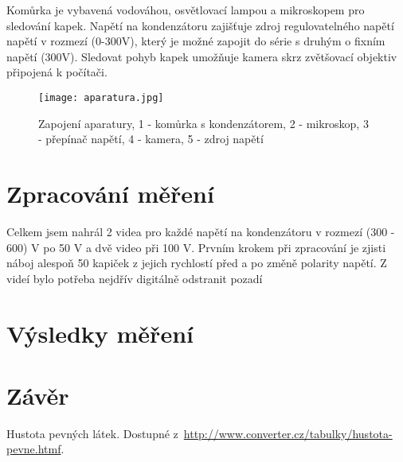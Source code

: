 \documentclass[a4paper,11pt]{article}
\begin{document}
Komůrka je vybavená vodováhou, osvětlovací lampou a mikroskopem pro sledování kapek. Napětí na kondenzátoru zajišťuje zdroj regulovatelného napětí napětí v rozmezí (0-300V), který je možné zapojit do série s druhým o fixním napětí (300V). Sledovat pohyb kapek umožňuje kamera skrz zvětšovací objektiv připojená k počítači. 

\begin{figure}[htpb]
    \centering
    \texttt{[image: aparatura.jpg]}
    \caption{Zapojení aparatury, 1 - komůrka s kondenzátorem, 2 - mikroskop, 3 - přepínač napětí, 4 - kamera, 5 - zdroj napětí}
\end{figure}

\section{Zpracování měření}

Celkem jsem nahrál 2 videa pro každé napětí na kondenzátoru v rozmezí (300 - 600) V po 50 V a dvě video při 100 V. Prvním krokem při zpracování je zjisti náboj alespoň 50 kapiček z jejich rychlostí před a po změně polarity napětí. Z videí bylo potřeba nejdřív digitálně odstranit pozadí 


\section{Výsledky měření}

\begin{figure}[htpb]
    \centering
    
    \caption{}
\end{figure}

\section{Závěr}

\begin{thebibliography}{0}
 Hustota pevných látek. Dostupné z~\url{http://www.converter.cz/tabulky/hustota-pevne.htmf}.   
\end{thebibliography}
\end{document}
